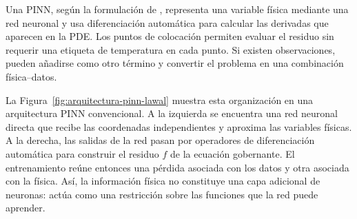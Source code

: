 Una PINN, según la formulación de \textcite[686--690]{raissi2019}, representa una variable física mediante una red neuronal y usa diferenciación automática para calcular las derivadas que aparecen en la PDE. Los puntos de colocación permiten evaluar el residuo sin requerir una etiqueta de temperatura en cada punto. Si existen observaciones, pueden añadirse como otro término y convertir el problema en una combinación física--datos.

La Figura~\ref{fig:arquitectura-pinn-lawal} muestra esta organización en una arquitectura PINN convencional. A la izquierda se encuentra una red neuronal directa que recibe las coordenadas independientes y aproxima las variables físicas. A la derecha, las salidas de la red pasan por operadores de diferenciación automática para construir el residuo $f$ de la ecuación gobernante. El entrenamiento reúne entonces una pérdida asociada con los datos y otra asociada con la física. Así, la información física no constituye una capa adicional de neuronas: actúa como una restricción sobre las funciones que la red puede aprender.

